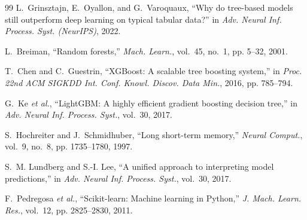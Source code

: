 \documentclass[conference,spanish]{IEEEtran}
\begin{document}
\begin{thebibliography}{99}
L.~Grinsztajn, E.~Oyallon, and G.~Varoquaux,
``Why do tree-based models still outperform deep learning on typical tabular data?''
in \textit{Adv. Neural Inf. Process. Syst. (NeurIPS)}, 2022.

L.~Breiman,
``Random forests,''
\textit{Mach. Learn.}, vol.~45, no.~1, pp. 5--32, 2001.

T.~Chen and C.~Guestrin,
``XGBoost: A scalable tree boosting system,''
in \textit{Proc. 22nd ACM SIGKDD Int. Conf. Knowl. Discov. Data Min.}, 2016, pp. 785--794.

G.~Ke \textit{et al.},
``LightGBM: A highly efficient gradient boosting decision tree,''
in \textit{Adv. Neural Inf. Process. Syst.}, vol.~30, 2017.

S.~Hochreiter and J.~Schmidhuber,
``Long short-term memory,''
\textit{Neural Comput.}, vol.~9, no.~8, pp. 1735--1780, 1997.

S.~M. Lundberg and S.-I. Lee,
``A unified approach to interpreting model predictions,''
in \textit{Adv. Neural Inf. Process. Syst.}, vol.~30, 2017.

F.~Pedregosa \textit{et al.},
``Scikit-learn: Machine learning in Python,''
\textit{J. Mach. Learn. Res.}, vol.~12, pp. 2825--2830, 2011.

\end{thebibliography}
\end{document}
